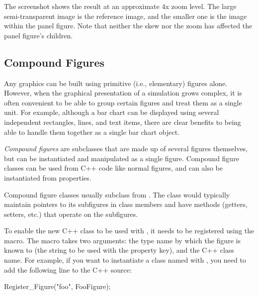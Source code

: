 
The screenshot shows the result at an approximate 4x zoom level. The large
semi-transparent image is the reference image, and the smaller one is the image within the panel
figure. Note that neither the skew nor the zoom has affected the panel figure's children.

\begin{center}
\end{center}


\subsection{Compound Figures}
\label{sec:graphics:compound-figures}

Any graphics can be built using primitive (i.e., elementary) figures
alone. However, when the graphical presentation of a simulation
grows complex, it is often convenient to be able to group certain
figures and treat them as a single unit. For example, although
a bar chart can be displayed using several independent rectangles,
lines, and text items, there are clear benefits to being able to
handle them together as a single bar chart object.

\textit{Compound figures} are  subclasses that
are made up of several figures themselves, but can be instantiated
and manipulated as a single figure. Compound figure classes
can be used from C++ code like normal figures, and can also
be instantiated from  properties.

Compound figure classes usually subclass from .
The class would typically maintain pointers to its subfigures in
class members and have methods (getters, setters, etc.) that operate
on the subfigures.

To enable the new C++ class to be used with ,
it needs to be registered using the  macro.
The macro takes two arguments: the type name by which the figure
is known to  (the string to be used with the  property key),
and the C++ class name. For example, if you want to instantiate
a class named  with ,
you need to add the following line to the C++ source:

\begin{cpp}
Register_Figure("foo", FooFigure);
\end{cpp}

